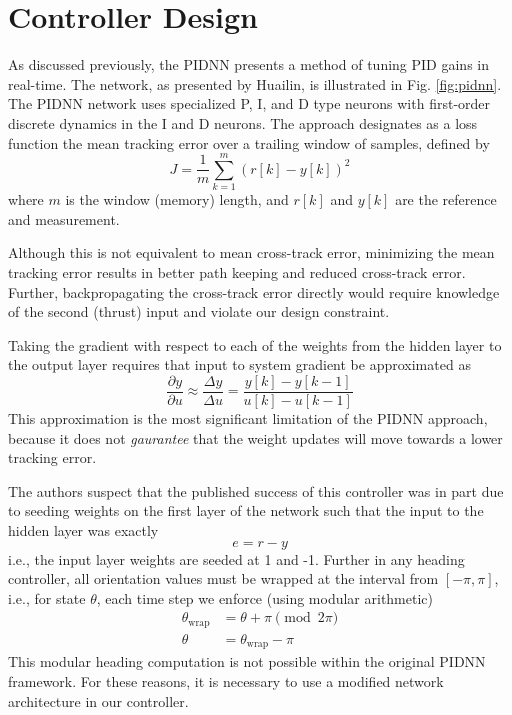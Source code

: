 \documentclass[conference]{IEEEtran}
\begin{document}

\section{Controller Design} %
\label{sec:pid_neural_network}
As discussed previously, the PIDNN presents a method of tuning PID gains in real-time. The network, as presented by Huailin, is illustrated in Fig. \ref{fig:pidnn}. The PIDNN network uses specialized P, I, and D type neurons with first-order discrete dynamics in the I and D neurons. The approach designates as a loss function the mean tracking error over a trailing window of samples, defined by
\begin{equation}
  J = \frac{1}{m} \sum\limits_{k=1}^{m} (r[k] - y[k])^2
\end{equation}
where $m$ is the window (memory) length, and $r[k]$ and $y[k]$ are the reference and measurement.

Although this is not equivalent to mean cross-track error, minimizing the mean tracking error results in better path keeping and reduced cross-track error. Further, backpropagating the cross-track error directly would require knowledge of the second (thrust) input and violate our design constraint. 

Taking the gradient with respect to each of the weights from the hidden layer to the output layer requires that input to system gradient be approximated as
\begin{equation}
  \frac{\partial y}{\partial u} \approx \frac{\Delta y}{\Delta u} = \frac{y[k] - y[k - 1]}{u[k] - u[k-1]}
\end{equation}
This approximation is the most significant limitation of the PIDNN approach, because it does not \textit{gaurantee} that the weight updates will move towards a lower tracking error.

The authors suspect that the published success of this controller was in part due to seeding weights on the first layer of the network such that the input to the hidden layer was exactly
\begin{equation}
  e = r - y
\end{equation}
i.e., the input layer weights are seeded at 1 and -1. Further in any heading controller, all orientation values must be wrapped at the interval from $[-\pi, \pi]$, i.e., for state $\theta$, each time step we enforce (using modular arithmetic)
\begin{align}
  \theta_{\text{wrap}} &= \theta + \pi \pmod{2\pi} \\
  \theta &= \theta_{\text{wrap}} - \pi
\end{align}
This modular heading computation is not possible within the original PIDNN framework. For these reasons, it is necessary to use a modified network architecture in our controller.
\end{document}
